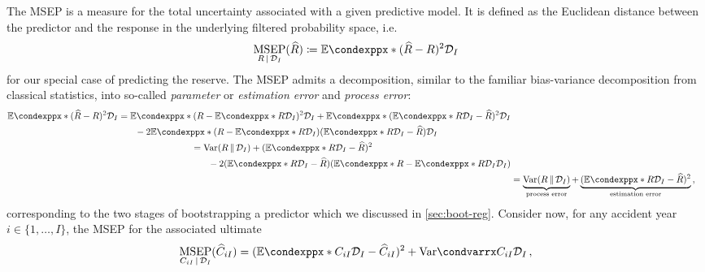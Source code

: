 \documentclass[a4paper]{book}
\begin{document}
The MSEP is a measure for the total uncertainty associated with a given predictive model. It is defined as the Euclidean distance between the predictor and the response in the underlying filtered probability space, i.e.\
\begin{equation}
  \underset{R \, \vert \, \mathcal{D}_I}{\mathrm{MSEP}}(\widehat{R}) \coloneqq \condexpp*{(\widehat{R} - R)^2}{\mathcal{D}_I}
\end{equation}
for our special case of predicting the reserve. The MSEP admits a decomposition, similar to the familiar bias-variance decomposition from classical statistics, into so-called \emph{parameter} or \emph{estimation error} and \emph{process error}:
\begin{align}
  \begin{split}
    \condexpp*{(\widehat{R} - R)^2}{\mathcal{D}_I} &= \condexpp*{(R - \condexpp*{R}{\mathcal{D}_I})^2}{\mathcal{D}_I} + \condexpp*{(\condexpp*{R}{\mathcal{D}_I} - \widehat{R})^2}{\mathcal{D}_I} \\ &\phantom{{}=1} -2\condexpp*{(R - \condexpp*{R}{\mathcal{D}_I})(\condexpp*{R}{\mathcal{D}_I} - \widehat{R})}{\mathcal{D}_I}
  \end{split} \\
  \begin{split}
    &= \mathrm{Var}(R \, \Vert \, \mathcal{D}_I) + (\condexpp*{R}{\mathcal{D}_I} - \widehat{R})^2 \\
    &\phantom{{}=1} -2(\condexpp*{R}{\mathcal{D}_I} - \widehat{R})(\condexpp*{R - \condexpp*{R}{\mathcal{D}_I}}{\mathcal{D}_I})
  \end{split}                                                                                                                                                                                                                                               \\
   & = \underbrace{\mathrm{Var}(R \, \Vert \, \mathcal{D}_I)}_\text{process error} + \underbrace{(\condexpp*{R}{\mathcal{D}_I} - \widehat{R})^2}_\text{estimation error} \,,
\end{align}
corresponding to the two stages of bootstrapping a predictor which we discussed in \cref{sec:boot-reg}. Consider now, for any accident year $i \in \{ 1, \dots, I \}$, the MSEP for the associated ultimate
\begin{equation} \label{eq:msep}
  \underset{C_{iI} \, \vert \, \mathcal{D}_I}{\mathrm{MSEP}}(\widehat{C}_{iI}) = (\condexpp*{C_{iI}}{\mathcal{D}_I} - \widehat{C}_{iI})^2 + \condvarr{C_{iI}}{\mathcal{D}_I} \,,
\end{equation}
\end{document}

